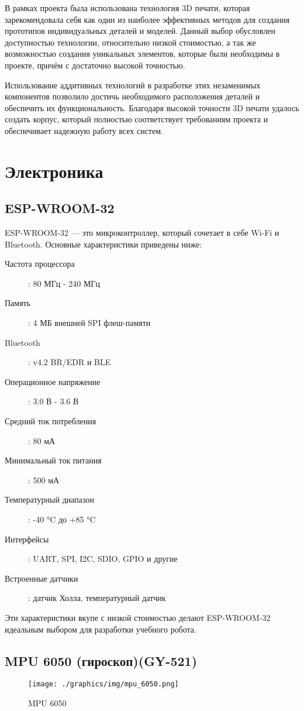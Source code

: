 В рамках проекта была использована технология 3D печати, которая зарекомендовала себя как один из наиболее эффективных методов для создания прототипов индивидуальных деталей и моделей.
Данный выбор обусловлен доступностью технологии, относительно низкой стоимостью, а так же возможностью создания уникальных элементов, которые были необходимы в проекте, причём с достаточно высокой точностью.

Использование аддитивных технологий в разработке этих незаменимых компонентов позволило достичь необходимого расположения деталей и обеспечить их функциональность. Благодаря высокой точности 3D печати удалось создать корпус, который полностью соответствует требованиям проекта и обеспечивает надежную работу всех систем.

\chapter{Электроника}

\section{ESP-WROOM-32}

ESP-WROOM-32 --- это микроконтроллер, который сочетает в себе Wi-Fi и Bluetooth. Основные характеристики приведены ниже:

\begin{description}
    \item[Частота процессора]: 80 МГц - 240 МГц
    \item[Память]: 4 МБ внешней SPI флеш-памяти
    \item[Bluetooth]: v4.2 BR/EDR и BLE
    \item[Операционное напряжение]: 3.0 В - 3.6 В
    \item[Средний ток потребления]: 80 мА
    \item[Минимальный ток питания]: 500 мА
    \item[Температурный диапазон]: -40 °C до +85 °C
    \item[Интерфейсы]: UART, SPI, I2C, SDIO, GPIO и другие
    \item[Встроенные датчики]: датчик Холла, температурный датчик
\end{description}

Эти характеристики вкупе с низкой стоимостью делают ESP-WROOM-32 идеальным выбором для разработки учебного робота.

\section{MPU 6050 (гироскоп)(GY-521)}
\begin{figure}[!h]
    \texttt{[image: ./graphics/img/mpu\_6050.png]}
    \caption{MPU 6050}
    \label{f:MPU_6050}
\end{figure}

